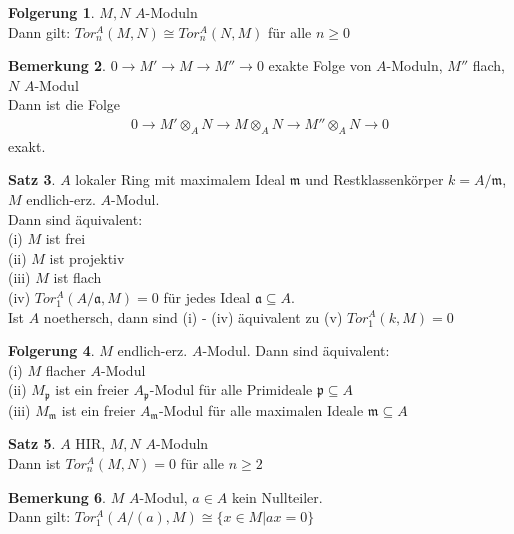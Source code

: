 \documentclass[10pt,a4paper,numbers=endperiod]{scrreprt}
\theoremstyle{definition}
\newtheorem{satz}{Satz}[section]
\newtheorem{bem}[satz]{Bemerkung}
\newtheorem{folg}[satz]{Folgerung}
\begin{document}
\begin{folg}
	$M, N$ $A$-Moduln\\
	Dann gilt: $Tor_n^A(M, N) \cong Tor_n^A(N,M)$ für alle $n \geq 0$
\end{folg}

\begin{bem}
	$0 \to M' \to M \to M'' \to 0$ exakte Folge von $A$-Moduln, $M''$ flach, $N$ $A$-Modul\\
	Dann ist die Folge \begin{align*}
		0 \to M' \otimes_A N \to M \otimes_A N \to M'' \otimes_A N \to 0
	\end{align*}
	exakt.
\end{bem}

\begin{satz}
	$A$ lokaler Ring mit maximalem Ideal $\mathfrak{m}$ und Restklassenkörper $k = A/\mathfrak{m}$, $M$ endlich-erz. $A$-Modul.\\
	Dann sind äquivalent:\\
	(i) $M$ ist frei\\
	(ii) $M$ ist projektiv\\
	(iii) $M$ ist flach\\
	(iv) $Tor_1^A(A/\mathfrak{a}, M) = 0$ für jedes Ideal $\mathfrak{a} \subseteq A$.\\
	Ist $A$ noethersch, dann sind (i) - (iv) äquivalent zu
	(v) $Tor_1^A(k, M) = 0$
\end{satz}

\begin{folg}
	$M$ endlich-erz. $A$-Modul. Dann sind äquivalent:\\
	(i) $M$ flacher $A$-Modul\\
	(ii) $M_\mathfrak{p}$ ist ein freier $A_\mathfrak{p}$-Modul für alle Primideale $\mathfrak{p} \subseteq A$\\
	(iii) $M_\mathfrak{m}$ ist ein freier $A_\mathfrak{m}$-Modul für alle maximalen Ideale $\mathfrak{m} \subseteq A$
\end{folg}

\begin{satz}
	$A$ HIR, $M, N$ $A$-Moduln\\
	Dann ist $Tor_n^A(M, N) = 0$ für alle $n \geq 2$
\end{satz}

\begin{bem}
	$M$ $A$-Modul, $a \in A$ kein Nullteiler.\\
	Dann gilt: $Tor_1^A(A/(a), M) \cong \{x \in M| ax = 0\}$
\end{bem}
\end{document}
